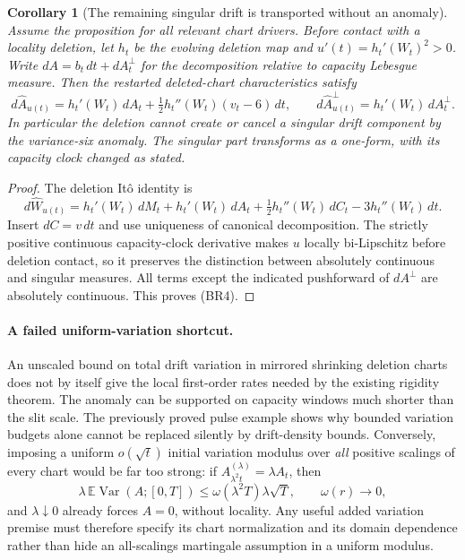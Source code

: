 \documentclass[11pt]{article}
\newtheorem{corollary}[theorem]{Corollary}
\theoremstyle{definition}\newtheorem{definition}[theorem]{Definition}
\theoremstyle{remark}\newtheorem{remark}[theorem]{Remark}
\begin{document}
\begin{corollary}[The remaining singular drift is transported without an anomaly]
\label{cor:singular-drift-transport}
Assume the proposition for all relevant chart drivers. Before contact
with a locality deletion, let $h_t$ be the evolving deletion map and
$u'(t)=h_t'(W_t)^2>0$. Write
$dA=b_t\,dt+dA^\perp_t$ for the decomposition relative to capacity
Lebesgue measure. Then the restarted deleted-chart characteristics
satisfy
\[
 d\widehat A_{u(t)}
   =h_t'(W_t)\,dA_t
       +\tfrac12h_t''(W_t)(v_t-6)\,dt,
 \qquad
 d\widehat A^\perp_{u(t)}
   =h_t'(W_t)\,dA^\perp_t.
 \tag{BR4}
\]
In particular the deletion cannot create or cancel a singular drift
component by the variance-six anomaly. The singular part transforms
as a one-form, with its capacity clock changed as stated.
\end{corollary}
\begin{proof}
The deletion It\^o identity is
\[
 d\widehat W_{u(t)}
 =h_t'(W_t)\,dM_t+h_t'(W_t)\,dA_t
     +\tfrac12h_t''(W_t)\,dC_t-3h_t''(W_t)\,dt.
\]
Insert $dC=v\,dt$ and use uniqueness of canonical decomposition.
The strictly positive continuous capacity-clock derivative makes
$u$ locally bi-Lipschitz before deletion contact, so it preserves
the distinction between absolutely continuous and singular measures.
All terms except the indicated pushforward of $dA^\perp$ are
absolutely continuous. This proves (BR4).
\end{proof}

\paragraph{A failed uniform-variation shortcut.}
An unscaled bound on total drift variation in mirrored shrinking
deletion charts does not by itself give the local first-order rates
needed by the existing rigidity theorem. The anomaly can be supported
on capacity windows much shorter than the slit scale. The previously
proved pulse example shows why bounded variation budgets alone cannot
be replaced silently by drift-density bounds. Conversely, imposing a
uniform $o(\sqrt t)$ initial variation modulus over \emph{all}
positive scalings of every chart would be far too strong: if
$A^{(\lambda)}_{\lambda^2t}=\lambda A_t$, then
\[
 \lambda\,\mathbb E\operatorname{Var}(A;[0,T])
 \le\omega(\lambda^2T)\lambda\sqrt T,
       \qquad\omega(r)\longrightarrow0,
\]
and $\lambda\downarrow0$ already forces $A=0$, without locality.
Any useful added variation premise must therefore specify its chart
normalization and its domain dependence rather than hide an
all-scalings martingale assumption in a uniform modulus.
\end{document}
